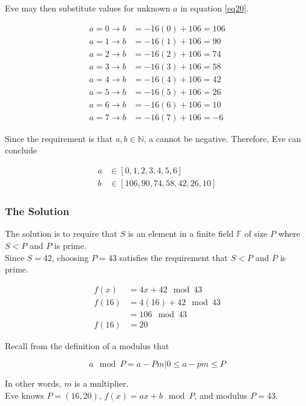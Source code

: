 \documentclass[preview,border=3mm]{article}
\begin{document}
\noindent
Eve may then substitute values for unknown $a$ in equation \ref{eq20}.

\begin{align*}
    a = 0 \rightarrow b &= -16(0) + 106 = 106 \\
    a = 1 \rightarrow b &= -16(1) + 106 = 90 \\
    a = 2 \rightarrow b &= -16(2) + 106 = 74 \\
    a = 3 \rightarrow b &= -16(3) + 106 = 58 \\
    a = 4 \rightarrow b &= -16(4) + 106 = 42 \\
    a = 5 \rightarrow b &= -16(5) + 106 = 26 \\
    a = 6 \rightarrow b &= -16(6) + 106 = 10 \\
    a = 7 \rightarrow b &= -16(7) + 106 = -6
\end{align*}

\noindent
Since the requirement is that $a,b \in \mathbb{N}$, a cannot be negative.
Therefore, Eve can conclude

\begin{align*}
    a &\in [0, 1, 2, 3, 4, 5, 6] \\
    b &\in [106, 90, 74, 58, 42, 26, 10]
\end{align*}


\subsubsection{The Solution}
The solution is to require that $S$ is an element in a finite field $\mathbb{F}$
of size $P$ where $S < P$ and $P$ is prime.\\

\noindent
Since $S = 42$, choosing $P = 43$ satisfies the requirement that $S < P$ and
$P$ is prime.

\begin{align*}
    f(x)  &= 4x + 42 \mod 43 \\
    f(16) &= 4(16) + 42 \mod 43 \\
          &= 106 \mod 43 \\
    f(16) &= 20
\end{align*}

\noindent
Recall from the definition of a modulus that

$$a \mod P = a - Pm | 0 \leq a - pm \leq P$$

\noindent
In other words, $m$ is a multiplier. \\

\noindent
Eve knows $P = (16, 20)$, $f(x) = ax + b \mod P$, and modulus $P = 43$. \\
\end{document}
